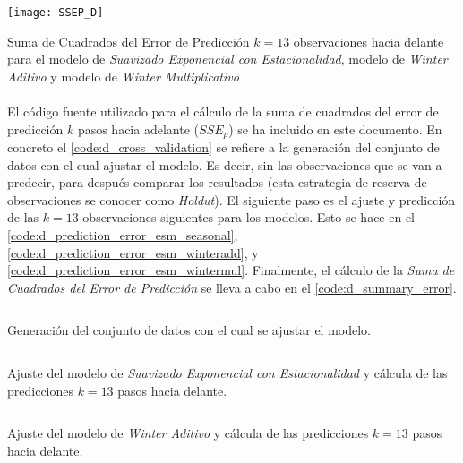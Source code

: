 \documentclass[a4paper, spanish]{article}
\begin{document}
    \begin{table}[htb!]
      \centering
      \texttt{[image: SSEP\_D]}
      \caption{Suma de Cuadrados del Error de Predicción $k =13$ observaciones hacia delante para el modelo de \emph{Suavizado Exponencial con Estacionalidad}, modelo de \emph{Winter Aditivo} y modelo de \emph{Winter Multiplicativo}}
      \label{table:sse_p_summary}
    \end{table}

    \paragraph{}
    El código fuente utilizado para el cálculo de la suma de cuadrados del error de predicción $k$ pasos hacia adelante ($SSE_p$) se ha incluido en este documento. En concreto el \autoref{code:d_cross_validation} se refiere a la generación del conjunto de datos con el cual ajustar el modelo. Es decir, sin las observaciones que se van a predecir, para después comparar los resultados (esta estrategia de reserva de observaciones se conocer como \emph{Holdut}). El siguiente paso es el ajuste y predicción de las $k = 13$ observaciones siguientes para los modelos. Esto se hace en el \autoref{code:d_prediction_error_esm_seasonal}, \autoref{code:d_prediction_error_esm_winteradd}, y \autoref{code:d_prediction_error_esm_wintermul}. Finalmente, el cálculo de la \emph{Suma de Cuadrados del Error de Predicción} se lleva a cabo en el \autoref{code:d_summary_error}.

    \begin{listing}[htb!]
      \centering
      \inputminted{SAS}{./res/code/d-01-cross-validation.sas}
      \caption{Generación del conjunto de datos con el cual se ajustar el modelo.}
      \label{code:d_cross_validation}
    \end{listing}

    \begin{listing}[htb!]
      \centering
      \inputminted{SAS}{./res/code/d-02-prediction-error-esm-seasonal.sas}
      \caption{Ajuste del modelo de \emph{Suavizado Exponencial con Estacionalidad} y cálcula de las predicciones $k = 13$ pasos hacia delante.}
      \label{code:d_prediction_error_esm_seasonal}
    \end{listing}

    \begin{listing}[htb!]
      \centering
      \inputminted{SAS}{./res/code/d-02-prediction-error-esm-winteradd.sas}
      \caption{Ajuste del modelo de \emph{Winter Aditivo} y cálcula de las predicciones $k = 13$ pasos hacia delante.}
      \label{code:d_prediction_error_esm_winteradd}
    \end{listing}
\end{document}

